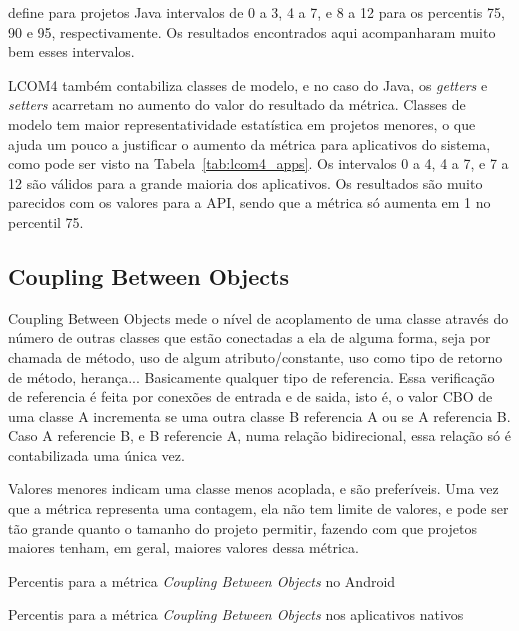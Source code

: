  define para projetos Java intervalos de 0 a 3, 4 a 7, e 8 a 12 para os percentis 75, 90 e 95, respectivamente. Os resultados encontrados aqui acompanharam muito bem esses intervalos.

LCOM4 também contabiliza classes de modelo, e no caso do Java, os \textit{getters} e \textit{setters} acarretam no aumento do valor do resultado da métrica\cite{meirelles2013}. Classes de modelo tem maior representatividade estatística em projetos menores, o que ajuda um pouco a justificar o aumento da métrica para aplicativos do sistema, como pode ser visto na Tabela~\ref{tab:lcom4_apps}. Os intervalos 0 a 4, 4 a 7, e 7 a 12 são válidos para a grande maioria dos aplicativos. Os resultados são muito parecidos com os valores para a API, sendo que a métrica só aumenta em 1 no percentil 75.

\subsection{Coupling Between Objects}

Coupling Between Objects mede o nível de acoplamento de uma classe através do número de outras classes que estão conectadas a ela de alguma forma, seja por chamada de método, uso de algum atributo/constante, uso como tipo de retorno de método, herança... Basicamente qualquer tipo de referencia. Essa verificação de referencia é feita por conexões de entrada e de saida, isto é, o valor CBO de uma classe A incrementa se uma outra classe B referencia A ou se A referencia B. Caso A referencie B, e B referencie A, numa relação bidirecional, essa relação só é contabilizada uma única vez. 

Valores menores indicam uma classe menos acoplada, e são preferíveis. Uma vez que a métrica representa uma contagem, ela não tem limite de valores, e pode ser tão grande quanto o tamanho do projeto permitir, fazendo com que projetos maiores tenham, em geral, maiores valores dessa métrica. 

\begin{table}[!htb]

\caption{Percentis para a métrica \textit{Coupling Between Objects} no Android}
\label{tab:cbo_android}
\end{table}

\begin{table}[!htb]

\caption{Percentis para a métrica \textit{Coupling Between Objects} nos aplicativos nativos}
\label{tab:cbo_apps}
\end{table}

